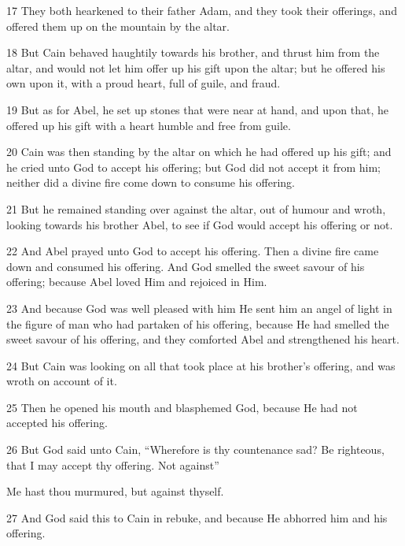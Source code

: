 \par 17 They both hearkened to their father Adam, and they took their offerings, and offered them up on the mountain by the altar.

\par 18 But Cain behaved haughtily towards his brother, and thrust him from the altar, and would not let him offer up his gift upon the altar; but he offered his own upon it, with a proud heart, full of guile, and fraud.

\par 19 But as for Abel, he set up stones that were near at hand, and upon that, he offered up his gift with a heart humble and free from guile.

\par 20 Cain was then standing by the altar on which he had offered up his gift; and he cried unto God to accept his offering; but God did not accept it from him; neither did a divine fire come down to consume his offering.

\par 21 But he remained standing over against the altar, out of humour and wroth, looking towards his brother Abel, to see if God would accept his offering or not.

\par 22 And Abel prayed unto God to accept his offering. Then a divine fire came down and consumed his offering. And God smelled the sweet savour of his offering; because Abel loved Him and rejoiced in Him.

\par 23 And because God was well pleased with him He sent him an angel of light in the figure of man who had partaken of his offering, because He had smelled the sweet savour of his offering, and they comforted Abel and strengthened his heart.

\par 24 But Cain was looking on all that took place at his brother's offering, and was wroth on account of it.

\par 25 Then he opened his mouth and blasphemed God, because He had not accepted his offering.

\par 26 But God said unto Cain, “Wherefore is thy countenance sad? Be righteous, that I may accept thy offering. Not against”

Me hast thou murmured, but against thyself.

\par 27 And God said this to Cain in rebuke, and because He abhorred him and his offering.

